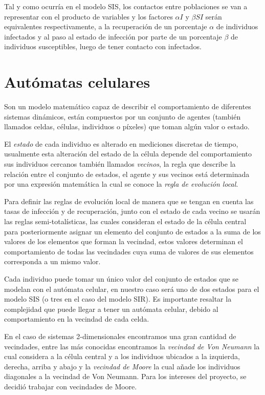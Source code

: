 Tal y como ocurría en el modelo SIS, los contactos entre poblaciones se van a representar con el producto de variables y los factores $\alpha I$ y $\beta SI$ serán equivalentes respectivamente, a la recuperación de un porcentaje $\alpha$ de individuos infectados y al paso al estado de infección por parte de un porcentaje $\beta$ de individuos susceptibles, luego de tener contacto con infectados\cite{diego2010}.

\section*{Autómatas celulares}
Son un modelo matemático capaz de describir el comportamiento de diferentes sistemas dinámicos, están compuestos por un conjunto de agentes (también llamados celdas, células, individuos o píxeles) que toman algún valor o estado.

El \textit{estado} de cada individuo es alterado en mediciones discretas de tiempo, usualmente esta alteración del estado de la célula depende del comportamiento sus individuos cercanos también llamados \textit{vecinos}, la regla que describe la relación entre el conjunto de estados, el agente y sus vecinos está determinada por una expresión matemática la cual se conoce la \textit{regla de evolución local}.\cite{descripcionyAplicaciones}

Para definir las reglas de evolución local de manera que se tengan en cuenta las tasas de infección y de recuperación, junto con el estado de cada vecino se usarán las reglas semi-totalísticas, las cuales consideran el estado de la célula central para posteriormente asignar un elemento del conjunto de estados a la suma de los valores de los elementos que forman la vecindad, estos valores determinan el comportamiento de todas las vecindades cuya suma de valores de sus elementos corresponda a un mismo valor.\cite{ACaplicacionesComputacion}

Cada individuo puede tomar un único valor del conjunto de estados que se modelan con el autómata celular, en nuestro caso será uno de dos estados para el modelo SIS (o tres en el caso del modelo SIR). Es importante resaltar la complejidad que puede llegar a tener un autómata celular, debido al comportamiento en la vecindad de cada celda.

En el caso de sistemas 2-dimensionales encontramos una gran cantidad de vecindades, entre las más conocidas encontramos la \textit{vecindad de Von Neumann} la cual considera a la célula central y a los individuos ubicados a la izquierda, derecha, arriba y abajo y la \textit{vecindad de Moore} la cual añade los individuos diagonales a la vecindad de Von Neumann. Para los intereses del proyecto, se decidió trabajar con vecindades de Moore. 

